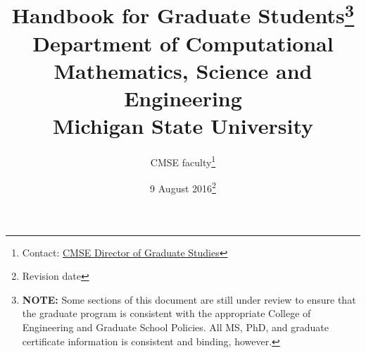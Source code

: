 \documentclass[12pt]{article}
\begin{document}
\vspace{-50mm}
\title{Handbook for Graduate Students\footnote{\textbf{NOTE:} Some
    sections of this document are still under review to ensure that
    the graduate program is consistent with the appropriate College of
  Engineering and Graduate School Policies.  All MS, PhD, and graduate
certificate information is consistent and binding, however.}\\
\vspace{20mm}
  \large Department of Computational Mathematics, Science and
  Engineering\\
\vspace{20mm}
Michigan State University
\vspace{50mm}
}

\author{CMSE faculty\footnote{Contact:
    \href{mailto:cmsegrad@msu.edu}{CMSE Director of Graduate Studies}
  }}

\date{9 August 2016\footnote{Revision date}}

\maketitle

\newpage

\tableofcontents

\newpage



\newpage



\newpage



\newpage



\newpage



\newpage



\newpage



\newpage



\newpage



\newpage



\newpage



\newpage


\end{document}
